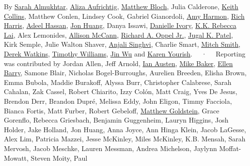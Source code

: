 By \href{https://www.nytimes3xbfgragh.onion/by/sarah-almukhtar}{Sarah
Almukhtar},
\href{https://www.nytimes3xbfgragh.onion/by/aliza-aufrichtig}{Aliza
Aufrichtig},
\href{https://www.nytimes3xbfgragh.onion/by/matthew-bloch}{Matthew
Bloch}, Julia Calderone,
\href{https://www.nytimes3xbfgragh.onion/by/keith-collins}{Keith
Collins}, Matthew Conlen, Lindsey Cook, Gabriel Gianordoli,
\href{https://www.nytimes3xbfgragh.onion/by/amy-harmon}{Amy Harmon},
\href{https://www.nytimes3xbfgragh.onion/by/rich-harris}{Rich Harris},
\href{https://www.nytimes3xbfgragh.onion/by/adeel-hassan}{Adeel Hassan},
\href{https://www.nytimes3xbfgragh.onion/by/jon-huang}{Jon Huang}, Danya
Issawi,
\href{https://www.nytimes3xbfgragh.onion/by/danielle-ivory}{Danielle
Ivory}, \href{https://www.nytimes3xbfgragh.onion/by/kk-rebecca-lai}{K.K.
Rebecca Lai}, Alex Lemonides,
\href{https://www.nytimes3xbfgragh.onion/by/allison-mccann}{Allison
McCann},
\href{https://www.nytimes3xbfgragh.onion/by/richard-a-oppel-jr}{Richard
A. Oppel Jr.},
\href{https://www.nytimes3xbfgragh.onion/by/jugal-k-patel}{Jugal K.
Patel}, Kirk Semple, Julie Walton Shaver,
\href{https://www.nytimes3xbfgragh.onion/by/anjali-singhvi}{Anjali
Singhvi}, Charlie Smart,
\href{https://www.nytimes3xbfgragh.onion/by/mitch-smith}{Mitch Smith},
\href{https://www.nytimes3xbfgragh.onion/by/derek-watkins}{Derek
Watkins},
\href{https://www.nytimes3xbfgragh.onion/by/timothy-williams}{Timothy
Williams}, \href{https://www.nytimes3xbfgragh.onion/by/jin-wu}{Jin Wu}
and \href{https://www.nytimes3xbfgragh.onion/by/karen-yourish}{Karen
Yourish}. ~~·~~ Reporting was contributed by Jordan Allen, Jeff Arnold,
\href{https://www.nytimes3xbfgragh.onion/by/ian-austen}{Ian Austen},
\href{https://www.nytimes3xbfgragh.onion/by/mike-baker}{Mike Baker},
\href{https://www.nytimes3xbfgragh.onion/by/ellen-barry}{Ellen Barry},
Samone Blair, Nicholas Bogel-Burroughs, Aurelien Breeden, Elisha Brown,
Emma Bubola, Maddie Burakoff, Alyssa Burr, Christopher Calabrese, Sarah
Cahalan, Zak Cassel, Robert Chiarito, Izzy Colón, Matt Craig, Yves De
Jesus, Brendon Derr, Brandon Dupré, Melissa Eddy, John Eligon, Timmy
Facciola, Bianca Fortis, Matt Furber, Robert Gebeloff,
\href{https://www.nytimes3xbfgragh.onion/by/matthew-goldstein}{Matthew
Goldstein}, Grace Gorenflo, Rebecca Griesbach, Benjamin Guggenheim,
Lauryn Higgins, Josh Holder, Jake Holland, Jon Huang, Anna Joyce, Ann
Hinga Klein, Jacob LaGesse, Alex Lim, Patricia Mazzei, Jesse McKinley,
Miles McKinley, K.B. Mensah, Sarah Mervosh, Jacob Meschke, Lauren
Messman, Andrea Michelson, Jaylynn Moffat-Mowatt, Steven Moity, Paul
